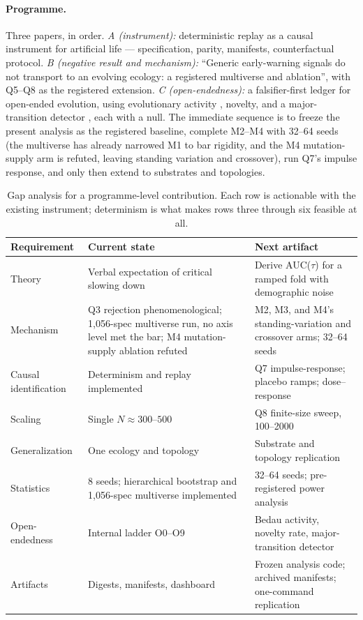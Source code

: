 \documentclass[11pt,a4paper]{article}
\begin{document}
\paragraph{Programme.} Three papers, in order. \emph{A (instrument):}
deterministic replay as a causal instrument for artificial life ---
specification, parity, manifests, counterfactual protocol. \emph{B (negative
result and mechanism):} ``Generic early-warning signals do not transport to an
evolving ecology: a registered multiverse and ablation'', with Q5--Q8 as the
registered extension. \emph{C (open-endedness):} a falsifier-first ledger for
open-ended evolution, using evolutionary activity \citep{bedau1998,bedau2003},
novelty, and a major-transition detector \citep{szathmary1995}, each with a null.
The immediate sequence is to freeze the present analysis as the registered
baseline, complete M2--M4 with 32--64 seeds (the multiverse has already narrowed
M1 to bar rigidity, and the M4 mutation-supply arm is refuted, leaving standing
variation and crossover), run Q7's impulse response, and only then extend to
substrates and topologies.

\begin{table}[t]\centering
\caption{Gap analysis for a programme-level contribution. Each row is
actionable with the existing instrument; determinism is what makes rows three
through six feasible at all.}\label{tab:programme}
\small
\begin{tabular}{p{2.6cm} p{5.4cm} p{5.0cm}}
\toprule
Requirement & Current state & Next artifact\\
\midrule
Theory & Verbal expectation of critical slowing down & Derive AUC($\tau$) for
a ramped fold with demographic noise\\
Mechanism & Q3 rejection phenomenological; 1,056-spec multiverse run, no axis
level met the bar; M4 mutation-supply ablation refuted & M2, M3, and M4's
standing-variation and crossover arms; 32--64 seeds\\
Causal identification & Determinism and replay implemented & Q7
impulse-response; placebo ramps; dose--response\\
Scaling & Single $N \approx 300$--$500$ & Q8 finite-size sweep, 100--2000\\
Generalization & One ecology and topology & Substrate and topology
replication\\
Statistics & 8 seeds; hierarchical bootstrap and 1,056-spec multiverse
implemented & 32--64 seeds; pre-registered power analysis\\
Open-endedness & Internal ladder O0--O9 & Bedau activity, novelty rate,
major-transition detector\\
Artifacts & Digests, manifests, dashboard & Frozen analysis code; archived
manifests; one-command replication\\
\bottomrule
\end{tabular}
\end{table}
\end{document}
